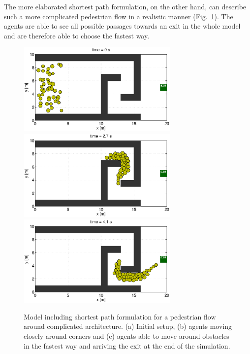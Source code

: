 \documentclass[11pt]{article}
\begin{document}
The more elaborated shortest path formulation, on the other hand, can describe such a more complicated pedestrian flow in a realistic manner (Fig.~\ref{fig:simple4}). The agents are able to see all possible passages towards an exit in the whole model and are therefore able to choose the fastest way.

\begin{figure}
	\begin{center}
	\includegraphics[width=0.7\textwidth]
	{figures/Model2_fastest_1_000000.eps}
	\qquad
	\includegraphics[width=0.7\textwidth]
	{figures/Model2_fastest_1_000270.eps}
	\qquad
	\includegraphics[width=0.7\textwidth]
	{figures/Model2_fastest_1_000410.eps}
	\caption{Model including shortest path formulation for a pedestrian flow around complicated architecture. (a) Initial setup, (b) agents moving closely around corners and (c) agents able to move around obstacles in the fastest way and arriving the exit at the end of the simulation.}
	\label{fig:simple4}
	\end{center}
\end{figure}
\end{document}
